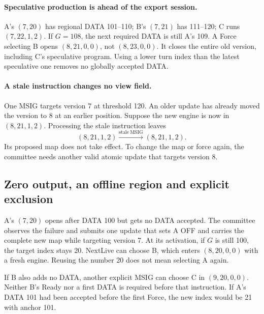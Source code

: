 \documentclass[11pt,a4paper]{article}
\begin{document}
\paragraph{Speculative production is ahead of the export session.}
A's $(7,20)$ has regional DATA 101--110; B's $(7,21)$ has 111--120; C runs
$(7,22,1,2)$. If $G=108$, the next required DATA is still A's 109. A Force
selecting B opens $(8,21,0,0)$, not $(8,23,0,0)$. It closes the entire old
version, including C's speculative program. Using a lower turn index than
the latest speculative one removes no globally accepted DATA.

\paragraph{A stale instruction changes no view field.}
One MSIG targets version 7 at threshold 120. An older update has already
moved the version to 8 at an earlier position. Suppose the new
engine is now in $(8,21,1,2)$. Processing the stale instruction leaves
\[
 (8,21,1,2)\xrightarrow{\mathrm{stale\ MSIG}}(8,21,1,2).
\]
Its proposed map does not take effect. To change the map or force again,
the committee needs another valid atomic update that targets version 8.

\subsection{Zero output, an offline region and explicit exclusion}
\label{sec:retry-example}
A's $(7,20)$ opens after DATA 100 but gets no DATA accepted. The committee
observes the failure and submits one update that sets A OFF and carries
the complete new map while targeting version 7. At its activation, if
$G$ is still 100, the target index stays 20. NextLive can choose B, which
enters $(8,20,0,0)$ with a fresh engine. Reusing the number 20 does not
mean selecting A again.

If B also adds no DATA, another explicit MSIG can choose C in
$(9,20,0,0)$. Neither B's Ready nor a first DATA is required before that
instruction. If A's DATA 101 had been accepted before the first Force,
the new index would be 21 with anchor 101.
\end{document}
